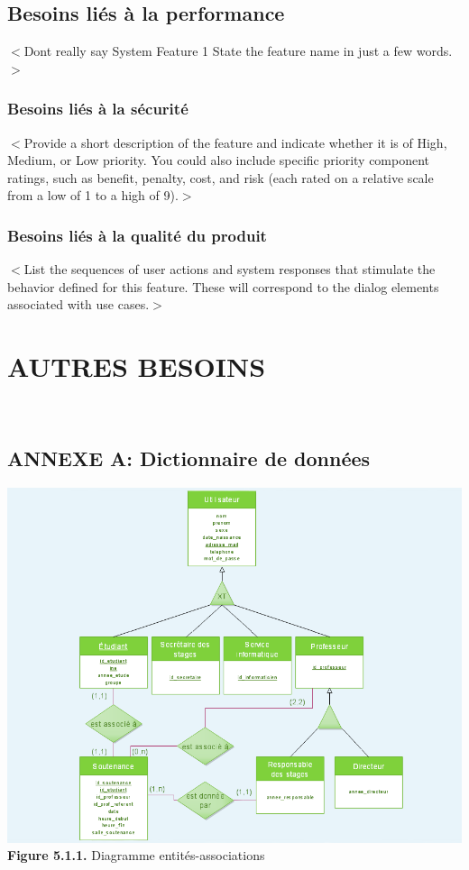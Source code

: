 \documentclass{scrreprt}
\begin{document}
\section{Besoins liés à la performance}
$<$Dont really say System Feature 1 State the feature name in just a few 
words.$>$

\subsection{Besoins liés à la sécurité}
$<$Provide a short description of the feature and indicate whether it is of 
High, Medium, or Low priority. You could also include specific priority 
component ratings, such as benefit, penalty, cost, and risk (each rated on a 
relative scale from a low of 1 to a high of 9).$>$

\subsection{Besoins liés à la qualité du produit }
$<$List the sequences of user actions and system responses that stimulate the 
behavior defined for this feature. These will correspond to the dialog elements 
associated with use cases.$>$





\chapter{AUTRES BESOINS}



\
\section{ANNEXE A: Dictionnaire de données}

\begin{center}
	\includegraphics[scale=0.45]{image/diagentiassoc.png}
	\textbf{Figure 5.1.1.} Diagramme entités-associations
\end{center}
\end{document}
